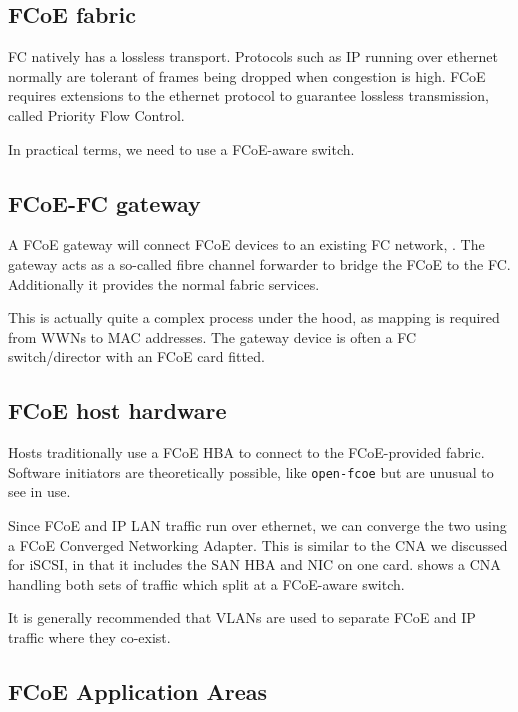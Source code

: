 \subsection{FCoE fabric}
\label{sec:fcoe-fabric}

FC natively has a lossless transport. Protocols such as IP running over
ethernet normally are tolerant of frames being dropped when congestion
is high. FCoE requires extensions to the ethernet protocol to guarantee
lossless transmission, called Priority Flow Control.

In practical terms, we need to use a FCoE-aware switch.

\subsection{FCoE-FC gateway}
\label{sec:fcoe-fc-gateway}

A FCoE gateway will connect FCoE devices to an existing FC network, .
The gateway acts as a so-called fibre channel forwarder to bridge the
FCoE to the FC. Additionally it provides the normal fabric services.


This is actually quite a complex process under the hood, as mapping is
required from WWNs to MAC addresses. The gateway device is often a FC
switch/director with an FCoE card fitted.

\subsection{FCoE host hardware}
\label{sec:fcoe-host-hardware}

Hosts traditionally use a FCoE HBA to connect to the FCoE-provided
fabric. Software initiators are theoretically possible, like
\texttt{open-fcoe} but are unusual to see in use.

Since FCoE and IP LAN traffic run over ethernet, we can converge the two
using a FCoE Converged Networking Adapter. This is similar to the CNA we
discussed for iSCSI, in that it includes the SAN HBA and NIC on one
card. shows a CNA handling both sets of traffic which split at a
FCoE-aware switch.


It is generally recommended that VLANs are used to separate FCoE and IP
traffic where they co-exist.

\subsection{FCoE Application Areas}
\label{sec:fcoe-application-areas}

